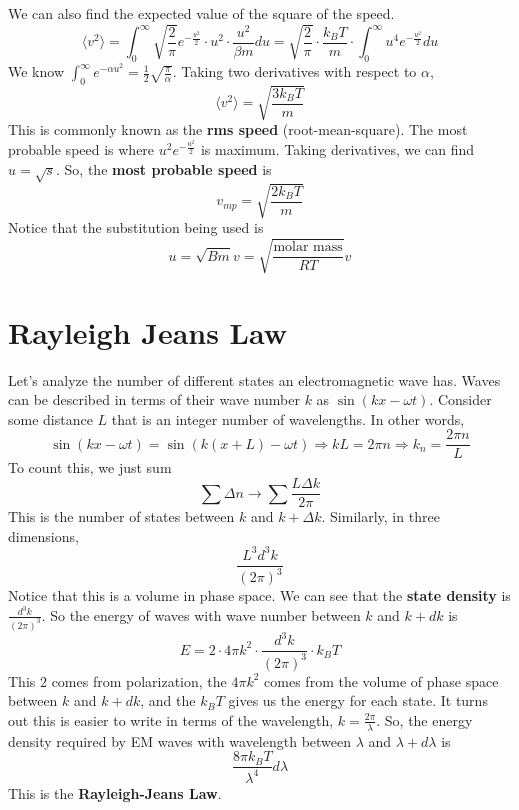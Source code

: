 \documentclass[../main.tex]{subfiles}
\newcommand{\expect}[1]{{\langle #1 \rangle}}
\begin{document}
We can also find the expected value of the square of the speed.
$$\expect{v^{2}}=\int_{0}^{\infty}\sqrt{\frac{2}{\pi}}e^{-\frac{u^{2}}{2}}\cdot u^{2}\cdot \frac{u^{2}}{\beta m}du
=\sqrt{\frac{2}{\pi}}\cdot\frac{k_{B}T}{m}\cdot\int_{0}^{\infty}u^{4}e^{-\frac{u^{2}}{2}}du
$$
We know $\int_{0}^{\infty}e^{-\alpha u^{2}}=\frac{1}{2}\sqrt{\frac{\pi}{\alpha}}$. Taking two derivatives with respect to $\alpha$,
$$\boxed{\expect{v^{2}}=\sqrt{\frac{3k_{B}T}{m}}}$$
This is commonly known as the \textbf{rms speed} (root-mean-square). The most probable speed is 
where $u^{2}e^{-\frac{u^{2}}{2}}$ is maximum. Taking derivatives, we can find $u=\sqrt{s}$. So, the 
\textbf{most probable speed} is
$$v_{mp}=\sqrt{\frac{2k_{B}T}{m}}$$
Notice that the substitution being used is
$$u=\sqrt{Bm}v=\sqrt{\frac{\text{molar mass}}{RT}}v$$

\section{Rayleigh Jeans Law}
Let's analyze the number of different states an electromagnetic wave has.
Waves can be described in terms of their wave number $k$ as $\sin(kx-\omega t)$.
Consider some distance $L$ that is an integer number of wavelengths. In other words,
$$\sin(kx-\omega t)=\sin(k(x+L)-\omega t)\Rightarrow
kL=2\pi n\Rightarrow
k_{n}=\frac{2\pi n}{L}$$
To count this, we just sum
$$\sum \Delta n\rightarrow \sum\frac{L\Delta k}{2\pi}$$
This is the number of states between $k$ and $k+\Delta k$. Similarly, in three dimensions,
$$\frac{L^{3}d^{3}k}{(2\pi)^{3}}$$
Notice that this is a volume in phase space. We can see that the \textbf{state density} is $\frac{d^{3}k}{(2\pi)^{3}}$.
So the energy of waves with wave number between $k$ and $k+dk$ is
$$E=2\cdot 4\pi k^{2}\cdot \frac{d^{3}k}{(2\pi)^{3}}\cdot k_{B}T$$
This $2$ comes from polarization, the $4\pi k^{2}$ comes from the volume of phase space between
$k$ and $k+dk$, and the $k_{B}T$ gives us the energy for each state. It turns out this is easier
to write in terms of the wavelength, $k=\frac{2\pi}{\lambda}$. So, the energy 
density required by EM waves with wavelength between $\lambda$ and $\lambda+d\lambda$ is
$$\frac{8\pi k_{B}T}{\lambda^{4}}d\lambda$$
This is the \textbf{Rayleigh-Jeans Law}. 
\end{document}
